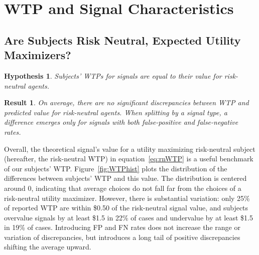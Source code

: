 \documentclass[12pt,a4paper]{article}
\newtheorem{hypothesis}{Hypothesis}
\newtheorem{result}{Result}
\begin{document}
\vspace{20pt}

\section{WTP and Signal Characteristics}\label{sec:results}

\subsection{Are Subjects Risk Neutral, Expected Utility Maximizers?} 

\begin{hypothesis}\label{hyp:eqRN} 
Subjects' WTPs for signals are equal to their value for risk-neutral agents. 
\end{hypothesis}

\begin{result} 
On average, there are no significant discrepancies between WTP and predicted value for risk-neutral agents. When splitting by a signal type, a difference emerges only for signals with both false-positive and false-negative rates.
\end{result}



%

Overall, the theoretical signal's value for a utility maximizing risk-neutral subject (hereafter, the risk-neutral WTP) in equation~\ref{eq:rnWTP} is a useful benchmark of our subjects' WTP. Figure~\ref{fig:WTPhist} plots the distribution of the differences between subjects' WTP and this value.  
The distribution is centered around 0, indicating that average choices do not fall far from the choices of a risk-neutral utility maximizer. However, there is substantial variation: only 25\% of reported WTP are within \$0.50 of the risk-neutral signal value, and subjects overvalue signals by at least \$1.5 in 22\% of cases and undervalue by at least \$1.5 in 19\% of cases. Introducing FP and FN rates does not increase the range or variation of discrepancies, but introduces a long tail of positive discrepancies shifting the average upward.
\end{document}

